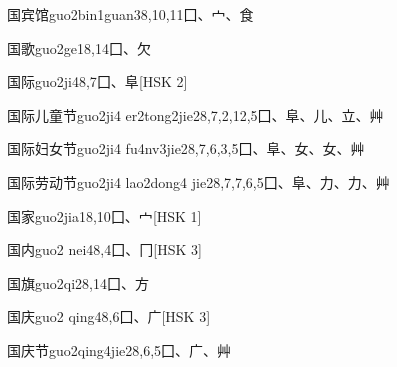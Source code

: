 \begin{entry}{国宾馆}{guo2bin1guan3}{8,10,11}{⼞、⼧、⾷}
\end{entry}

\begin{entry}{国歌}{guo2ge1}{8,14}{⼞、⽋}
\end{entry}

\begin{entry}{国际}{guo2ji4}{8,7}{⼞、⾩}[HSK 2]
\end{entry}

\begin{entry}{国际儿童节}{guo2ji4 er2tong2jie2}{8,7,2,12,5}{⼞、⾩、⼉、⽴、⾋}
\end{entry}

\begin{entry}{国际妇女节}{guo2ji4 fu4nv3jie2}{8,7,6,3,5}{⼞、⾩、⼥、⼥、⾋}
\end{entry}

\begin{entry}{国际劳动节}{guo2ji4 lao2dong4 jie2}{8,7,7,6,5}{⼞、⾩、⼒、⼒、⾋}
\end{entry}

\begin{entry}{国家}{guo2jia1}{8,10}{⼞、⼧}[HSK 1]
\end{entry}

\begin{entry}{国内}{guo2 nei4}{8,4}{⼞、⼌}[HSK 3]
\end{entry}

\begin{entry}{国旗}{guo2qi2}{8,14}{⼞、⽅}
\end{entry}

\begin{entry}{国庆}{guo2 qing4}{8,6}{⼞、⼴}[HSK 3]
\end{entry}

\begin{entry}{国庆节}{guo2qing4jie2}{8,6,5}{⼞、⼴、⾋}
\end{entry}

